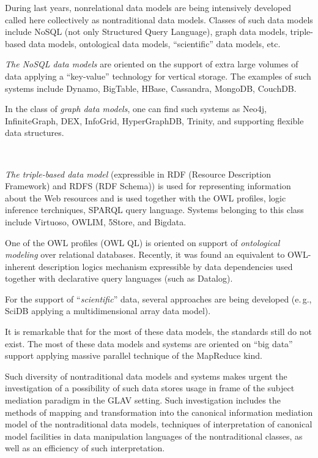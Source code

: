 \begin{multicols}{2}
During last years, nonrelational data models are being intensively developed called here 
collectively as nontraditional data models. Classes of such data models include NoSQL
(not only Structured Query Language), graph data 
models, triple-based data models, ontological data models, ``scientific'' data models, etc.

\textit{The NoSQL data models} are oriented on the support of extra large volumes of data applying a 
``key-value'' technology for vertical storage. 
The examples of such systems include Dynamo, BigTable, 
HBase, Cassandra, MongoDB, CouchDB.

In the class of \textit{graph data models}, one can find such systems as Neo4j, InfiniteGraph, DEX, 
InfoGrid, HyperGraphDB, Trinity, and supporting flexible data structures.

\begin{figure*} %
\vspace*{1pt}
 \begin{center}
 \mbox{%
 \epsfxsize=146.911mm
 }
 \end{center}
 \vspace*{-9pt}
\end{figure*}

\textit{The triple-based data model} (expressible in RDF (Resource Description Framework)
and RDFS (RDF Schema)) is used for representing information 
about the Web resources and is used together with the OWL profiles, logic inference terchniques, 
SPARQL query language. Systems belonging to this class include Virtuoso, OWLIM, 5Store, 
and Bigdata.

One of the OWL profiles (OWL QL) is oriented on support of \textit{ontological modeling} over 
relational databases. Recently, it was found an equivalent to OWL-inherent description logics 
mechanism expressible by data dependencies used together with declarative query languages (such 
as Datalog). 

For the support of ``\textit{scientific}'' data, several approaches are being developed (e.\,g., SciDB 
applying a multidimensional array data model). 

It is remarkable that for the most of these data models, the standards still do not exist. 
The most of these 
data models and systems are oriented on ``big data'' support applying massive parallel technique of 
the MapReduce kind.

Such diversity of nontraditional data models and systems makes urgent the investigation of a 
possibility of such data stores usage in frame of the subject mediation paradigm in the GLAV 
setting. Such investigation includes the methods of mapping and transformation into the canonical 
information mediation model of the nontraditional data models, techniques of interpretation of 
canonical model facilities in data manipulation languages of the nontraditional classes, as well as 
an efficiency of such interpretation.


\end{multicols}
